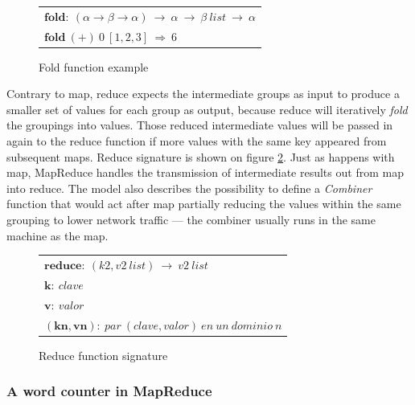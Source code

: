 \begin{figure}[tbp]
\begin{center}
\begin{tabular}{|l|}
\hline
$\mathbf{fold:} \: \left( \alpha \rightarrow \beta \rightarrow \alpha \right) \: \rightarrow \: \alpha \: \rightarrow \: \beta \: list \: \rightarrow \: \alpha$ \\
$\mathbf{fold} \: \left( \mathbf{+} \right) \: 0 \: \left[ 1,2,3 \right] \: \Rightarrow \: 6$ \\
\hline
\end{tabular}
\caption{Fold function example}
\label{fig:fold}
\end{center}
\end{figure}

Contrary to map, reduce expects the intermediate groups as input to produce a smaller set of values for each group as output, because reduce will iteratively \emph{fold} the groupings into values. Those reduced intermediate values will be passed in again to the reduce function if more values with the same key appeared from subsequent maps. Reduce signature is shown on figure \ref{fig:reduce}. Just as happens with map, MapReduce handles the transmission of intermediate results out from map into reduce. The model also describes the possibility to define a \emph{Combiner} function that would act after map partially reducing the values within the same grouping to lower network traffic --- the combiner usually runs in the same machine as the map.

\begin{figure}[tbp]
\begin{center}
\begin{tabular}{|l|}
\hline
$\mathbf{reduce:} \: \left( k2,v2 \: list \right) \: \rightarrow \: v2 \: list$ \\
$\mathbf{k:} \: clave$ \\
$\mathbf{v:} \: valor$ \\
$\mathbf{\left(kn,vn \right):} \: par \: \left(clave,valor\right) \: en \: un \: dominio \: n$ \\
\hline
\end{tabular}
\caption{Reduce function signature}
\label{fig:reduce}
\end{center}
\end{figure}

\subsubsection{A word counter in MapReduce}\label{subsubsec:wordcount}

